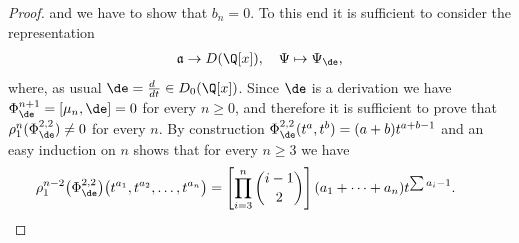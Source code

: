 \begin{proof}
and we have to show that $b_n=0$. To this end it is suf\/f\/icient to consider the representation
\begin{gather*} \mathfrak{a}\to D(\Q[x]),\quad \Psi\mapsto \Psi_\de,\end{gather*}
where, as usual $\de=\frac{d~}{dt}\in D_0(\Q[x])$. Since $\de$ is a derivation we have
$\Phi^{n+1}_\de=[\mu_n,\de]=0$ for every $n\ge 0$, and therefore it is suf\/f\/icient to prove that $\rho_1^{n}(\Phi^{2,2}_\de)\not=0$ for every $n$.
By construction $\Phi^{2,2}_\de(t^a,t^b)=(a+b)t^{a+b-1}$ and an easy induction on $n$ shows that for every $n\ge 3$ we have
\begin{gather*} \rho_1^{n-2}\big(\Phi^{2,2}_\de\big)\big(t^{a_1},t^{a_2},\ldots,t^{a_n}\big)=
\left[\prod_{i=3}^n\binom{i-1}{2}\right](a_1+\cdots+a_n)t^{\sum a_i-1}.\tag*{\qed}\end{gather*}
\renewcommand{\qed}{}
\end{proof}
